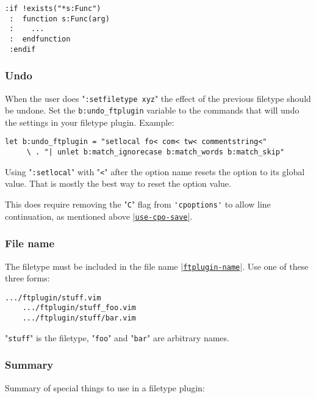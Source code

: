 \begin{Verbatim}[samepage=true]
 :if !exists("*s:Func")
 :  function s:Func(arg)
 :    ...
 :  endfunction
 :endif
\end{Verbatim}

\subsubsection{Undo}
\label{undo_ftplugin}

When the user does "\verb!:setfiletype xyz!" the effect of the previous filetype should be undone.
Set the \verb!b:undo_ftplugin! variable to the commands that will undo the settings in your filetype plugin.
Example:

\begin{Verbatim}[samepage=true]
 let b:undo_ftplugin = "setlocal fo< com< tw< commentstring<"
     \ . "| unlet b:match_ignorecase b:match_words b:match_skip"
\end{Verbatim}

Using "\verb!:setlocal!" with "\verb!<!" after the option name resets the option to its global value.
That is mostly the best way to reset the option value.

This does require removing the "\verb!C!" flag from \verb!'cpoptions'! to allow line continuation, as mentioned above \hyperref[use-cpo-save]{|\texttt{use-cpo-save}|}.

\subsubsection{File name}
The filetype must be included in the file name \hyperref[ftplugin-name]{|\texttt{ftplugin-name}|}.
Use one of these three forms:

\begin{Verbatim}[samepage=true]
    .../ftplugin/stuff.vim
    .../ftplugin/stuff_foo.vim
    .../ftplugin/stuff/bar.vim
\end{Verbatim}

"\verb!stuff!" is the filetype, "\verb!foo!" and "\verb!bar!" are arbitrary names.

\subsubsection{Summary}
\label{ftplugin-special}
Summary of special things to use in a filetype plugin:


